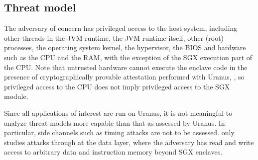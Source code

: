 \subsection{Threat model}
The adversary of concern has privileged access to the host system,
including other threads in the JVM runtime, the JVM runtime itself,
other (root) processes, the operating system kernel,
the hypervisor, the BIOS and hardware such as the CPU and the RAM,
with the exception of the SGX execution part of the CPU.
Note that untrusted hardware cannot execute the enclave code
in the presence of cryptographically provable attestation performed with Uranus,
\cite{uranus},
so privileged access to the CPU does not imply privileged access to the SGX module.

Since all applications of interest are run on Uranus,
it is not meaningful to analyze threat models more capable than that as assessed by Uranus.
In particular, side channels such as timing attacks are not to be assessed.
\pname{} only studies attacks through at the data layer,
where the adversary has read and write access
to arbitrary data and instruction memory beyond SGX enclaves.
